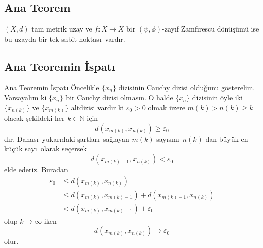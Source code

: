 \documentclass[8pt]{beamer}
\begin{document}
\subsection{Ana Teorem}
\begin{frame}
  \begin{theorem}
    $(X,d)$  tam metrik uzay ve $f: X \rightarrow X$ bir $(\psi,\phi)$-zay\i f Zamfirescu d\"{o}n\"{u}\c{s}\"{u}m\"{u} ise bu uzayda bir tek sabit noktas\i \ vard\i r.
  \end{theorem}
\end{frame}%




\subsection{Ana Teoremin \.{I}spat\i }
\begin{frame}
  \begin{block}{Ana Teoremin \.{I}spat\i }
    \"{O}ncelikle $\{x_n\}$ dizisinin Cauchy dizisi oldu\u{g}unu g\"osterelim. Varsayal\i m ki $\{x_n\}$ bir Cauchy dizisi olmas\i n. O halde $\{x_n\}$ dizisinin \"oyle iki $\{x_{n(k)}\}$ ve $\{x_{m(k)}\}$ altdizisi vard\i r ki $\varepsilon_0 > 0$ olmak \"uzere $m(k)>n(k)\geq k$ olacak \c{s}ekildeki her $k\in \mathbb{N}$ i\c{c}in $$d(x_{m(k)},x_{n(k)})\geq \varepsilon_0$$ d\i r. Dahas\i\ yukar\i daki \c{s}artlar\i\ sa\u{g}layan $m(k)$ say\i s\i n\i\ $n(k)$ dan b\"uy\"uk en k\"u\c{c}\"uk say\i\ olarak se\c{c}ersek $$d(x_{m(k)-1},x_{n(k)})<\varepsilon_0$$ elde ederiz. Buradan
    \begin{align}
      \varepsilon_0 &\leq d(x_{m(k)},x_{n(k)})\\
      &\leq d(x_{m(k)},x_{m(k)-1})+d(x_{m(k)-1},x_{n(k)})\\
      & <d(x_{m(k)},x_{m(k)-1})+\varepsilon_0
    \end{align}
olup $k\to \infty$ iken
    \begin{equation}
      d(x_{m(k)},x_{n(k)})\to \varepsilon_0
    \end{equation}
olur.
\end{block}
\end{frame}
\end{document}
